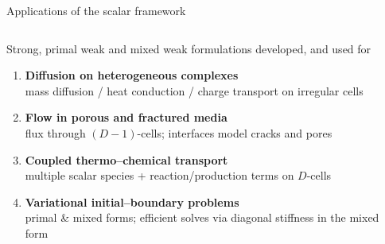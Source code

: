\begin{frame}{Applications of the scalar framework
\href{https://arxiv.org/abs/2505.09443}{}
}

\begin{columns}[T,onlytextwidth]

\vspace{-0.50cm}
\begin{block}{\small Strong, primal weak and mixed weak formulations developed, and used for}
\begin{enumerate}
\item \textbf{\small Diffusion on heterogeneous complexes}\\[-2pt]
{\scriptsize mass diffusion / heat conduction / charge transport on irregular cells}
\item \textbf{\small Flow in porous and fractured media}\\[-2pt]
{\scriptsize flux through \((D\!-\!1)\)-cells; interfaces model cracks and pores}
\href{https://www.sciencedirect.com/science/article/pii/S030917082500209X}{}
\href{https://www.sciencedirect.com/science/article/pii/S1365160926000365}{}
\item \textbf{\small Coupled thermo--chemical transport}\\[-2pt]
{\scriptsize multiple scalar species + reaction/production terms on \(D\)-cells}
\item \textbf{\small Variational initial--boundary problems}\\[-2pt]
{\scriptsize primal \& mixed forms; efficient solves via diagonal stiffness in the mixed form}
\end{enumerate}
\end{block}

\begin{center}
\end{center}
\end{columns}
\end{frame}
